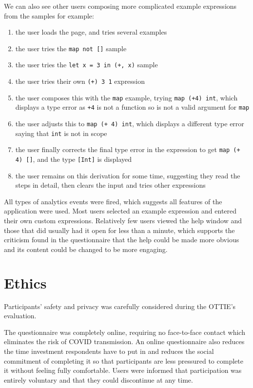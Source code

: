 \documentclass[a4paper,fleqn,oneside,12pt]{report}
\begin{document}
We can also see other users composing more complicated example expressions from the samples for example:
\begin{enumerate}
  \item the user loads the page, and tries several examples
  \item the user tries the \texttt{map not []} sample
  \item the user tries the \texttt{let x = 3 in (+, x)} sample
  \item the user tries their own \texttt{(+) 3 1} expression
  \item the user composes this with the \texttt{map} example, trying \texttt{map (+4) int}, which displays a type error as \texttt{+4} is not a function so is not a valid argument for \texttt{map}
  \item the user adjusts this to \texttt{map (+ 4) int}, which displays a different type error saying that \texttt{int} is not in scope
  \item the user finally corrects the final type error in the expression to get \texttt{map (+ 4) []}, and the type \texttt{[Int]} is displayed
  \item the user remains on this derivation for some time, suggesting they read the steps in detail, then clears the input and tries other expressions
\end{enumerate}

All types of analytics events were fired, which suggests all features of the application were used. Most users selected an example expression and entered their own custom expressions. Relatively few users viewed the help window and those that did usually had it open for less than a minute, which supports the criticism found in the questionnaire that the help could be made more obvious and its content could be changed to be more engaging.

\section{Ethics}\label{id:h.q5st3bb4afm1}

Participants' safety and privacy was carefully considered during the OTTIE's evaluation.

The questionnaire was completely online, requiring no face-to-face contact which eliminates the risk of COVID transmission. An online questionnaire also reduces the time investment respondents have to put in and reduces the social commitment of completing it so that participants are less pressured to complete it without feeling fully comfortable. Users were informed that participation was entirely voluntary and that they could discontinue at any time.
\end{document}
